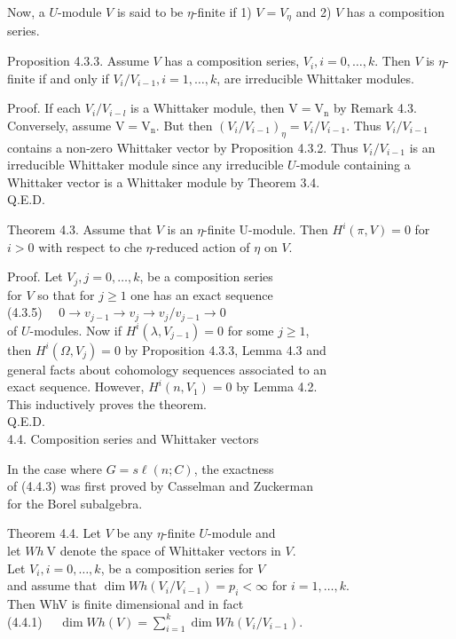 \documentclass[10pt]{article}
\begin{document}
Now, a $U$-module $V$ is said to be $\eta$-finite if 1) $V=V_{\eta}$ and 2) $V$ has a composition series.

Proposition 4.3.3. Assume $V$ has a composition series, $V_{i}, i=0, \ldots, k$. Then $V$ is $\eta$-finite if and only if $V_{i} / V_{i-1}, i=1, \ldots, k$, are irreducible Whittaker modules.

Proof. If each $V_{i} / V_{i-l}$ is a Whittaker module, then $\mathrm{V}=\mathrm{V}_{\mathrm{n}}$ by Remark 4.3. Conversely, assume $\mathrm{V}=\mathrm{V}_{\mathrm{n}}$. But then $\left(V_{i} / V_{i-1}\right)_{\eta}=V_{i} / V_{i-1}$. Thus $V_{i} / V_{i-1}$ contains a non-zero Whittaker vector by Proposition 4.3.2. Thus $V_{i} / V_{i-1}$ is an irreducible Whittaker module since any irreducible $U$-module containing a Whittaker vector is a Whittaker module by Theorem 3.4.\\
Q.E.D.

Theorem 4.3. Assume that $V$ is an $\eta$-finite U-module. Then $H^{i}(\pi, V)=0$ for $i>0$ with respect to che $\eta$-reduced action of $\eta$ on $V$.

Proof. Let $V_{j}, j=0, \ldots, k$, be a composition series\\
for $V$ so that for $j \geq 1$ one has an exact sequence\\
(4.3.5) $\quad 0 \rightarrow v_{j-1} \rightarrow v_{j} \rightarrow v_{j} / v_{j-1} \rightarrow 0$\\
of $U$-modules. Now if $H^{i}\left(\lambda, V_{j-1}\right)=0$ for some $j \geq 1$,\\
then $H^{i}\left(\Omega, V_{j}\right)=0$ by Proposition 4.3.3, Lemma 4.3 and\\
general facts about cohomology sequences associated to an\\
exact sequence. However, $H^{i}\left(n, V_{1}\right)=0$ by Lemma 4.2.\\
This inductively proves the theorem.\\
Q.E.D.\\
4.4. Composition series and Whittaker vectors

In the case where $G=s \ell(n ; C)$, the exactness\\
of (4.4.3) was first proved by Casselman and Zuckerman\\
for the Borel subalgebra.

Theorem 4.4. Let $V$ be any $\eta$-finite $U$-module and\\
let $W h \mathrm{~V}$ denote the space of Whittaker vectors in $V$.\\
Let $V_{i}, i=0, \ldots, k$, be a composition series for $V$\\
and assume that $\operatorname{dim} W h\left(V_{i} / V_{i-1}\right)=p_{i}<\infty$ for $i=1, \ldots, k$.\\
Then WhV is finite dimensional and in fact\\
(4.4.1) $\quad \operatorname{dim} W h(V)=\sum_{i=1}^{k} \operatorname{dim} W h\left(V_{i} / V_{i-1}\right)$.
\end{document}
